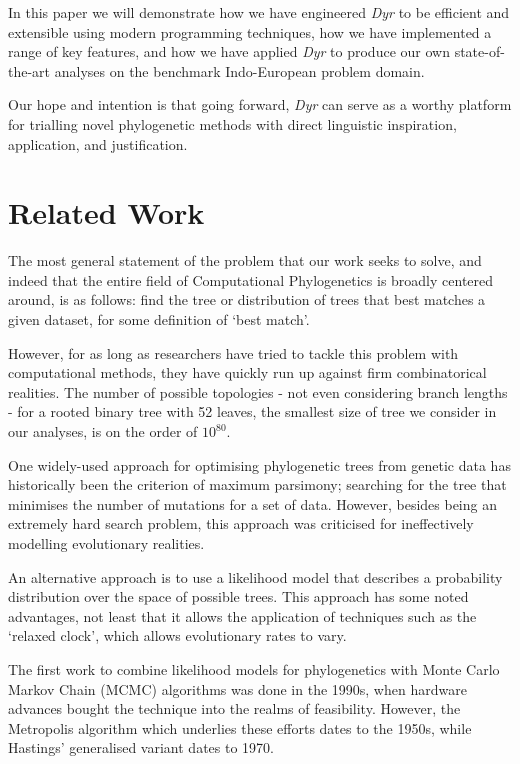 \documentclass[10pt,journal,compsoc]{IEEEtran}
\begin{document}
In this paper we will demonstrate how we have engineered \textit{Dyr} to be efficient and extensible using modern programming techniques, how we have implemented a range of key features, and how we have applied \textit{Dyr} to produce our own state-of-the-art analyses on the benchmark Indo-European problem domain.

Our hope and intention is that going forward, \textit{Dyr} can serve as a worthy platform for trialling novel phylogenetic methods with direct linguistic inspiration, application, and justification.

\section{Related Work}

The most general statement of the problem that our work seeks to solve, and indeed that the entire field of Computational Phylogenetics is broadly centered around, is as follows: find the tree or distribution of trees that best matches a given dataset, for some definition of `best match'.

However, for as long as researchers have tried to tackle this problem with computational methods, they have quickly run up against firm combinatorical realities. The number of possible topologies - not even considering branch lengths - for a rooted binary tree with 52 leaves, the smallest size of tree we consider in our analyses, is on the order of $10^{80}$.\cite{felsenstein2004inferring}

One widely-used approach for optimising phylogenetic trees from genetic data has historically been the criterion of maximum parsimony; searching for the tree that minimises the number of mutations for a set of data. However, besides being an extremely hard search problem, this approach was criticised for ineffectively modelling evolutionary realities.

An alternative approach is to use a likelihood model that describes a probability distribution over the space of possible trees. This approach has some noted advantages, not least that it allows the application of techniques such as the `relaxed clock', which allows evolutionary rates to vary.

The first work to combine likelihood models for phylogenetics with Monte Carlo Markov Chain (MCMC) algorithms was done in the 1990s, when hardware advances bought the technique into the realms of feasibility. However, the Metropolis algorithm which underlies these efforts dates to the 1950s, while Hastings' generalised variant dates to 1970.
\end{document}
